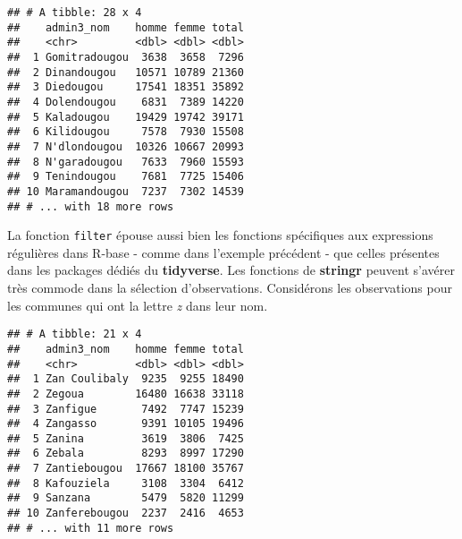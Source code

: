 \documentclass[]{book}
\newenvironment{Shaded}{\begin{snugshade}}{\end{snugshade}}
\newcommand{\KeywordTok}[1]{\textcolor[rgb]{0.13,0.29,0.53}{\textbf{#1}}}
\newcommand{\DataTypeTok}[1]{\textcolor[rgb]{0.13,0.29,0.53}{#1}}
\newcommand{\DecValTok}[1]{\textcolor[rgb]{0.00,0.00,0.81}{#1}}
\newcommand{\StringTok}[1]{\textcolor[rgb]{0.31,0.60,0.02}{#1}}
\newcommand{\CommentTok}[1]{\textcolor[rgb]{0.56,0.35,0.01}{\textit{#1}}}
\newcommand{\OperatorTok}[1]{\textcolor[rgb]{0.81,0.36,0.00}{\textbf{#1}}}
\newcommand{\NormalTok}[1]{#1}
\begin{document}
\begin{verbatim}
## # A tibble: 28 x 4
##    admin3_nom    homme femme total
##    <chr>         <dbl> <dbl> <dbl>
##  1 Gomitradougou  3638  3658  7296
##  2 Dinandougou   10571 10789 21360
##  3 Diedougou     17541 18351 35892
##  4 Dolendougou    6831  7389 14220
##  5 Kaladougou    19429 19742 39171
##  6 Kilidougou     7578  7930 15508
##  7 N'dlondougou  10326 10667 20993
##  8 N'garadougou   7633  7960 15593
##  9 Tenindougou    7681  7725 15406
## 10 Maramandougou  7237  7302 14539
## # ... with 18 more rows
\end{verbatim}

La fonction \texttt{filter} épouse aussi bien les fonctions spécifiques
aux expressions régulières dans R-base - comme dans l'exemple précédent
- que celles présentes dans les packages dédiés du \textbf{tidyverse}.
Les fonctions de \textbf{stringr} peuvent s'avérer très commode dans la
sélection d'observations. Considérons les observations pour les communes
qui ont la lettre \emph{z} dans leur nom.

\begin{Shaded}
\end{Shaded}

\begin{verbatim}
## # A tibble: 21 x 4
##    admin3_nom    homme femme total
##    <chr>         <dbl> <dbl> <dbl>
##  1 Zan Coulibaly  9235  9255 18490
##  2 Zegoua        16480 16638 33118
##  3 Zanfigue       7492  7747 15239
##  4 Zangasso       9391 10105 19496
##  5 Zanina         3619  3806  7425
##  6 Zebala         8293  8997 17290
##  7 Zantiebougou  17667 18100 35767
##  8 Kafouziela     3108  3304  6412
##  9 Sanzana        5479  5820 11299
## 10 Zanferebougou  2237  2416  4653
## # ... with 11 more rows
\end{verbatim}
\end{document}
